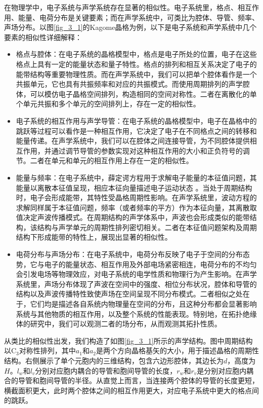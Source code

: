 在物理学中，电子系统与声学系统存在显著的相似性。电子系统里，格点、相互作用、能量、电荷分布是关键要素；而在声学系统中，可类比为腔体、导管、频率、声场分布。以图\ref{fig_3_1}的Kagome晶格为例，以下是电子系统和声学系统中几个要素的相似性详细解释：
\begin{itemize}
  \item 格点与腔体：在电子系统的晶格模型中，格点是电子所处的位置，电子在这些格点上具有一定的能量状态和量子特性。格点的排列和相互关系决定了电子的能带结构等重要物理性质。而在声学系统中，我们可以把单个腔体看作是一个共振单元，它也具有共振频率和对应的共振模式。而使用周期排列的声学腔体，可以模仿电子晶格空间排列，构造相同的空间对称性。二者在离散化的单个单元共振和多个单元的空间排列上，存在一定的相似性。
  \item 电子系统的相互作用与声学导管：在电子系统的晶格模型中，电子在晶格中的跳跃等过程可以看作是一种相互作用，它决定了电子在不同格点之间的转移和能量传递。在声学系统中，我们可以在腔体之间连接导管，为不同腔体提供相互作用，并通过调节导管的参数实现对这种相互作用的大小和正负符号的调节。二者在单元和单元的相互作用上存在一定的相似性。
  \item 能量与频率：在电子系统中，薛定谔方程用于求解电子能量的本征值问题，其能量以离散本征值呈现，相应本征向量描述电子运动状态 。当处于周期结构时，电子会形成能带，其特性受晶格周期性影响。在声学系统里，波动方程的求解同样属于本征值问题，频率（或者频率的平方）作为本征向量，其离散取值决定声波传播模式。在周期结构的声学体系中，声波也会形成类似的能带结构，该结构与声学单元的周期性排列密切相关。二者在本征值问题架构及周期结构下形成能带的特性上，展现出显著的相似性。 
  \item 电荷分布与声场分布：在电子系统中，电荷分布反映了电子于空间的分布态势，它与电子的能量状态、相互作用及外部电场紧密相连，电荷分布的不均匀会引发电场等物理效应，对电子系统的电学性质和物理行为产生影响。在声学系统里，声场分布体现了声波在空间中的强度、相位分布状况，腔体和导管的结构以及声波传播特性致使声场在空间呈现不同分布模式。二者相似之处在于，它们均是描述各自系统内物理量在空间的分布，且这种分布都会显著影响系统与其他物质的相互作用，以及整个系统的性能表现。特别地，在拓扑绝缘体的研究中，我们可以观测二者的场分布，从而观测其拓扑性质。 
\end{itemize}

从类比的相似性出发，我们构造了如图\ref{fig_3_1}所示的声学结构。图中周期结构以C$_{3}$对称性排列，其中$a_1$和$a_2$是两个方向晶格基矢的大小，用于描述晶格的周期性结构。右侧展示了单个元胞内的三维结构，包含六边形腔体，其边长为$d$，高度为$H$。$l_w$和$l_v$分别对应胞内耦合的导管和胞间导管的长度，$r_w$和$r_v$是分别对应胞内耦合的导管和胞间导管的半径。从直觉上而言，当连接两个腔体的导管的长度更短，横截面积更大，此时两个腔体之间的相互作用更大，对应电子系统中更大的格点间的跳跃。

